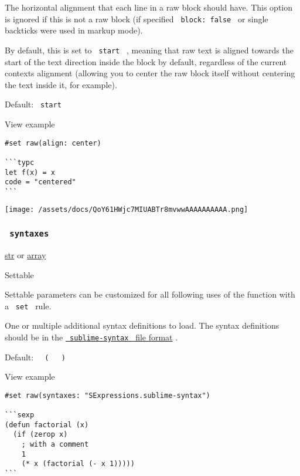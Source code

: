 The horizontal alignment that each line in a raw block should have. This
option is ignored if this is not a raw block (if specified
\texttt{\ block:\ false\ } or single backticks were used in markup
mode).

By default, this is set to \texttt{\ start\ } , meaning that raw text is
aligned towards the start of the text direction inside the block by
default, regardless of the current context\textquotesingle s alignment
(allowing you to center the raw block itself without centering the text
inside it, for example).

Default: \texttt{\ start\ }


View example

\begin{verbatim}
#set raw(align: center)

```typc
let f(x) = x
code = "centered"
```
\end{verbatim}

\texttt{[image: /assets/docs/QoY61HWjc7MIUABTr8mvwwAAAAAAAAAA.png]}

\subsubsection{\texorpdfstring{\texttt{\ syntaxes\ }}{ syntaxes }}\label{parameters-syntaxes}

\href{/docs/reference/foundations/str/}{str} {or}
\href{/docs/reference/foundations/array/}{array}

{{ Settable }}

\label{parameters-syntaxes-settable-tooltip}
Settable parameters can be customized for all following uses of the
function with a \texttt{\ set\ } rule.

One or multiple additional syntax definitions to load. The syntax
definitions should be in the
\href{https://www.sublimetext.com/docs/syntax.html}{\texttt{\ sublime-syntax\ }
file format} .

Default:
\texttt{\ }{\texttt{\ (\ }}\texttt{\ }{\texttt{\ )\ }}\texttt{\ }


View example

\begin{verbatim}
#set raw(syntaxes: "SExpressions.sublime-syntax")

```sexp
(defun factorial (x)
  (if (zerop x)
    ; with a comment
    1
    (* x (factorial (- x 1)))))
```
\end{verbatim}

